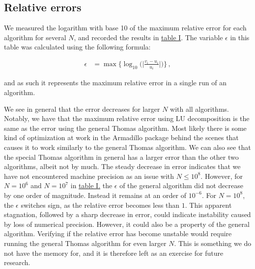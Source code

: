 \documentclass[english,notitlepage,reprint,nofootinbib]{revtex4-1}  %
\begin{document}
\subsection{Relative errors} \label{subsec:IV:B}

We measured the logarithm with base 10 of the maximum relative error for each algorithm for several $N$, and recorded the results in \hyperref[table:iv:b:1]{table I}. The variable $\epsilon$ in this table was calculated using the following formula:

\begin{align*}
\epsilon &= \max\bigg\{\log_{10} \bigg( \bigg| \frac{v_i-u_i}{u_i} \bigg| \bigg)\bigg\} \, ,
\end{align*} 

and as such it represents the maximum relative error in a single run of an algorithm. 

We see in general that the error decreases for larger $N$ with all algorithms. Notably, we have that the maximum relative error using LU decomposition is the same as the error using the general Thomas algorithm. Most likely there is some kind of optimization at work in the Armadillo package behind the scenes that causes it to work similarly to the general Thomas algorithm. We can also see that the special Thomas algorithm in general has a larger error than the other two algorithms, albeit not by much. The steady decrease in error indicates that we have not encountered machine precision as an issue with $N \leq 10^8$. However, for \(N=10^{6}\) and \(N=10^{7}\) in \hyperref[table:iv:b:1]{table I.} the \(\epsilon\) of the general algorithm did not decrease by one order of magnitude. Instead it remains at an order of \(10^{-6}\). For \(N=10^{8}\), the \(\epsilon\) switches sign, as the relative error becomes less than \(1\). This apparent stagnation, followed by a sharp decrease in error, could indicate instability caused by loss of numerical precision. However, it could also be a property of the general algorithm. Verifying if the relative error has become unstable would require running the general Thomas algorithm for even larger \(N\). This is something we do not have the memory for, and it is therefore left as an exercise for future research.
\end{document}
